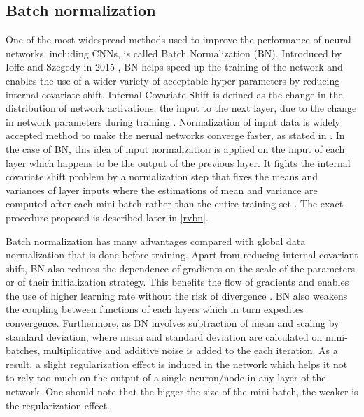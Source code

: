  \subsection{Batch normalization}\label{ssec:bn}
One of the most widespread methods used to improve the performance of neural networks, including CNNs, is called Batch Normalization (BN). 
Introduced by Ioffe and Szegedy in 2015 \cite{bnIoffeS15}, BN helps speed up the training of the network and enables the use of a wider variety of acceptable hyper-parameters by reducing internal covariate shift. 
Internal Covariate Shift is defined as the change in the distribution of network activations, the input to the next layer, due to the change in network parameters during training \cite{bnIoffeS15}. Normalization of input data is widely accepted method to make the nerual networks converge faster, as stated in \cite{LeCun1998}. In the case of BN, this idea of input normalization is applied on the input of each layer which happens to be the output of the previous layer. It fights the internal covariate shift problem by a normalization step that fixes the means and variances of layer inputs where the estimations of mean and variance are computed
after each mini-batch rather than the entire training set \cite{recent_advances}. The exact procedure proposed is described later in \ref{rvbn}.

Batch normalization has many advantages compared with global data
normalization that is done before training. Apart from reducing internal covariant shift, BN also reduces the dependence of gradients on the scale of the parameters or of their initialization strategy. This benefits the flow of gradients and enables the use of higher learning rate without the risk of divergence \cite{recent_advances}. BN also weakens the coupling between functions of each layers which in turn expedites convergence.  
Furthermore, as BN involves subtraction of mean and scaling by standard deviation, where mean and standard deviation are calculated on mini-batches, multiplicative and additive noise is added to the each iteration. As a result, a slight regularization effect is induced in the network which helps it not to rely too much on the output of a single neuron/node in any layer of the network. One should note that the bigger the size of the mini-batch, the weaker is the regularization effect. 

